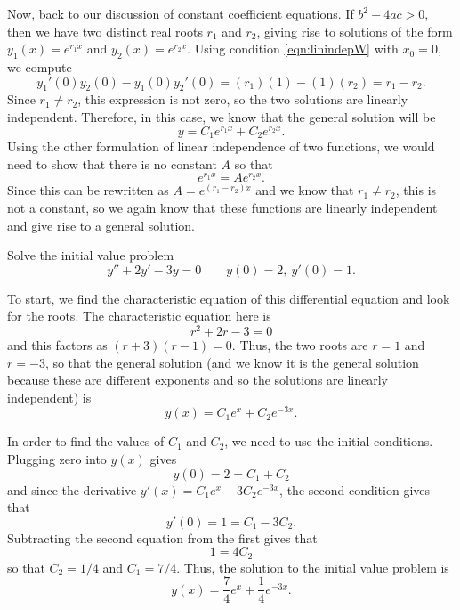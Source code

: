 \medskip

Now, back to our discussion of constant coefficient equations. If $b^2 - 4ac > 0$, then we have two distinct real roots $r_1$ and $r_2$, giving rise to solutions of the form $y_1(x) = e^{r_1x}$ and $y_2(x) = e^{r_2x}$. Using condition \ref{eqn:linindepW} with $x_0 = 0$, we compute
\begin{equation*}
y_1'(0)y_2(0) - y_1(0)y_2'(0) = (r_1)(1) - (1)(r_2) = r_1 - r_2.
\end{equation*}
Since $r_1 \neq r_2$, this expression is not zero, so the two solutions are linearly independent. Therefore, in this case, we know that the general solution will be
\begin{equation*}
y = C_1e^{r_1x} + C_2e^{r_2x}.
\end{equation*}
Using the other formulation of linear independence of two functions, we would need to show that there is no constant $A$ so that 
\[ e^{r_1x} = A e^{r_2x}. \] Since this can be rewritten as $A = e^{(r_1-r_2)x}$ and we know that $r_1 \neq r_2$, this is not a constant, so we again know that these functions are linearly independent and give rise to a general solution.

\begin{example}
Solve the initial value problem
\begin{equation*}
y'' + 2y' - 3y = 0 \qquad y(0) = 2,\ y'(0) = 1. 
\end{equation*}
\end{example}

\begin{exampleSol}
To start, we find the characteristic equation of this differential equation and look for the roots. The characteristic equation here is 
\begin{equation*}
r^2 + 2r - 3 = 0
\end{equation*}
and this factors as $(r+3)(r-1) = 0$. Thus, the two roots are $r=1$ and $r=-3$, so that the general solution (and we know it is the general solution because these are different exponents and so the solutions are linearly independent) is
\begin{equation*}
y(x) = C_1e^{x} + C_2e^{-3x}.
\end{equation*}

In order to find the values of $C_1$ and $C_2$, we need to use the initial conditions. Plugging zero into $y(x)$ gives
\begin{equation*}
y(0) = 2 = C_1 + C_2
\end{equation*}
and since the derivative $y'(x) = C_1e^x - 3C_2e^{-3x}$, the second condition gives that
\begin{equation*}
y'(0) = 1 = C_1 - 3C_2.
\end{equation*}
Subtracting the second equation from the first gives that
\begin{equation*}
1 = 4C_2
\end{equation*}
so that $C_2 = 1/4$ and $C_1 = 7/4$. Thus, the solution to the initial value problem is
\begin{equation*}
y(x) = \frac{7}{4}e^x + \frac{1}{4}e^{-3x}.
\end{equation*}
\end{exampleSol}


